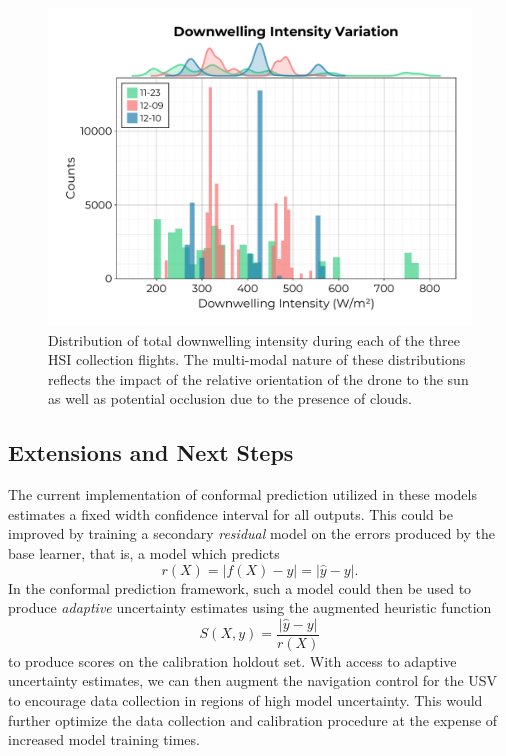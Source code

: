 \documentclass[journal,article,submit,pdftex,moreauthors]{Definitions/mdpi}
\begin{document}
\begin{figure}[H]
\includegraphics[width=10.5 cm]{paper/figures/results/downwelling-hist.pdf}
\caption{Distribution of total downwelling intensity during each of the three HSI collection flights. The multi-modal nature of these distributions reflects the impact of the relative orientation of the drone to the sun as well as potential occlusion due to the presence of clouds.\label{fig:downwelling-hist}}
\end{figure}   


\subsection{Extensions and Next Steps}

The current implementation of conformal prediction utilized in these models estimates a fixed width confidence interval for all outputs. This could be improved by training a secondary \textit{residual} model on the errors produced by the base learner, that is, a model which predicts 
\begin{equation}
    r(X) = \lvert f(X) - y \rvert = \lvert \hat{y} - y \rvert.
\end{equation}
In the conformal prediction framework, such a model could then be used to produce \textit{adaptive} uncertainty estimates using the augmented heuristic function
\begin{equation}
    S(X,y)  = \dfrac{\lvert \hat{y} - y \rvert }{r(X)}
\end{equation}
to produce scores on the calibration holdout set. With access to adaptive uncertainty estimates, we can then augment the navigation control for the USV to encourage data collection in regions of high model uncertainty. This would further optimize the data collection and calibration procedure at the expense of increased model training times. 
\end{document}
